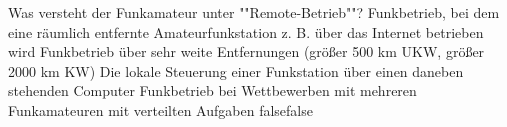     {Was versteht der Funkamateur unter ""Remote-Betrieb""?}
    {Funkbetrieb, bei dem eine räumlich entfernte Amateurfunkstation z. B. über das Internet betrieben wird}
    {Funkbetrieb über sehr weite Entfernungen (größer 500 km UKW, größer 2000 km KW)}
    {Die lokale Steuerung einer Funkstation über einen daneben stehenden Computer}
    {Funkbetrieb bei Wettbewerben mit mehreren Funkamateuren mit verteilten Aufgaben}
    {false}{false}